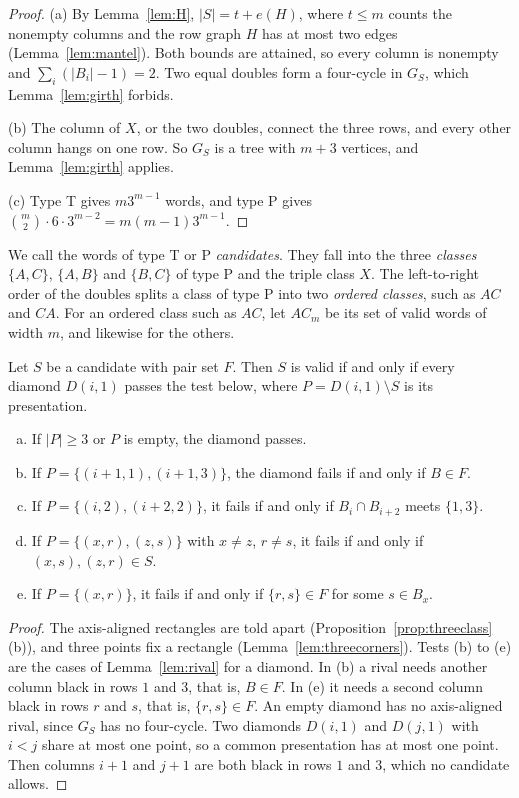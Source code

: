 \begin{proof}
(a) By Lemma~\ref{lem:H}, $|S|=t+e(H)$, where $t\le m$ counts the nonempty columns and the row
graph $H$ has at most two edges (Lemma~\ref{lem:mantel}). Both bounds are attained, so every
column is nonempty and $\sum_i(|B_i|-1)=2$. Two equal doubles form a four-cycle in $G_S$, which
Lemma~\ref{lem:girth} forbids.

(b) The column of $X$, or the two doubles, connect the three rows, and every other column hangs
on one row. So $G_S$ is a tree with $m+3$ vertices, and Lemma~\ref{lem:girth} applies.

(c) Type T gives $m3^{m-1}$ words, and type P gives $\binom m2\cdot6\cdot3^{m-2}=m(m-1)3^{m-1}$.
\end{proof}

We call the words of type T or P \emph{candidates}. They fall into the three \emph{classes}
$\{A,C\}$, $\{A,B\}$ and $\{B,C\}$ of type P and the triple class $X$. The left-to-right order of
the doubles splits a class of type P into two \emph{ordered classes}, such as $AC$ and $CA$. For
an ordered class such as $AC$, let $AC_m$ be its set of valid words of width $m$, and likewise
for the others.

\begin{lemma}\label{lem:diamond}
Let $S$ be a candidate with pair set $F$. Then $S$ is valid if and only if every diamond
$D(i,1)$ passes the test below, where $P=D(i,1)\setminus S$ is its presentation.
\begin{enumerate}[(a)]
\item If $|P|\ge3$ or $P$ is empty, the diamond passes.
\item If $P=\{(i+1,1),(i+1,3)\}$, the diamond fails if and only if $B\in F$.
\item If $P=\{(i,2),(i+2,2)\}$, it fails if and only if $B_i\cap B_{i+2}$ meets $\{1,3\}$.
\item If $P=\{(x,r),(z,s)\}$ with $x\ne z$, $r\ne s$, it fails if and only if $(x,s),(z,r)\in S$.
\item If $P=\{(x,r)\}$, it fails if and only if $\{r,s\}\in F$ for some $s\in B_x$.
\end{enumerate}
\end{lemma}

\begin{proof}
The axis-aligned rectangles are told apart (Proposition~\ref{prop:threeclass}(b)), and three
points fix a rectangle (Lemma~\ref{lem:threecorners}). Tests (b) to (e) are the cases of Lemma~\ref{lem:rival} for a diamond. In (b) a rival needs
another column black in rows $1$ and $3$, that is, $B\in F$. In (e) it needs a second column
black in rows $r$ and $s$, that is, $\{r,s\}\in F$. An empty diamond has no axis-aligned rival, since $G_S$ has no four-cycle. Two diamonds $D(i,1)$
and $D(j,1)$ with $i<j$ share at most one point, so a common presentation has at most one point.
Then columns $i+1$ and $j+1$ are both black in rows $1$ and $3$, which no candidate allows.
\end{proof}

